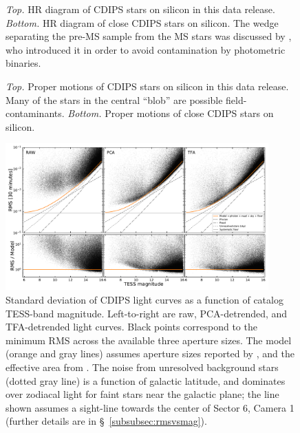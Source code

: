 \documentclass[12pt,twocolumn,tighten]{aastex62}
\begin{document}
\begin{figure}[!ht]
	\vspace{-1.1cm}
	\vspace{-0.9cm}
	\caption{
    {\it Top.} HR diagram of CDIPS stars on silicon in this data
    release.  {\it Bottom.} HR diagram of close CDIPS stars on
    silicon. The wedge separating the pre-MS sample from the MS stars
    was discussed by \citet{zari_3d_2018}, who introduced it in order
    to avoid contamination by photometric binaries.
	}
	\label{fig:hrd}
\end{figure}

\begin{figure}[!t]
	\vspace{-0.9cm}
	\vspace{-0.9cm}
	\caption{
		{\it Top.} Proper motions of CDIPS stars on silicon in this
		data release.  Many of the stars in the central ``blob'' are possible
		field-contaminants.
		{\it Bottom.} Proper motions of close CDIPS stars
		on silicon.
	}
	\label{fig:propermotions}
\end{figure}

\begin{figure}[!t]
	\begin{center}
		\leavevmode
		\includegraphics[width=0.9\textwidth]{IRM-PCA-TFA_rms_vs_mag.pdf}
	\end{center}
	\vspace{-0.5cm}
	\caption{
    Standard deviation of CDIPS light curves as a function of catalog
    TESS-band magnitude.  Left-to-right are raw, PCA-detrended, and
    TFA-detrended light curves. Black points correspond to the minimum
    RMS across the available three aperture sizes.  The model (orange
    and gray lines) assumes aperture sizes reported by
    \citet{Sullivan_et_al_2015}, and the effective area from
    \citet{vanderspek_2018}.  The noise from unresolved background
    stars (dotted gray line) is a function of galactic latitude, and
    dominates over zodiacal light for faint stars near the galactic
    plane; the line shown assumes a sight-line towards the center of
    Sector 6, Camera 1 (further details are in
    \S~\ref{subsubsec:rmsvsmag}).
		\label{fig:rms_vs_mag}
	}
\end{figure}
\end{document}
